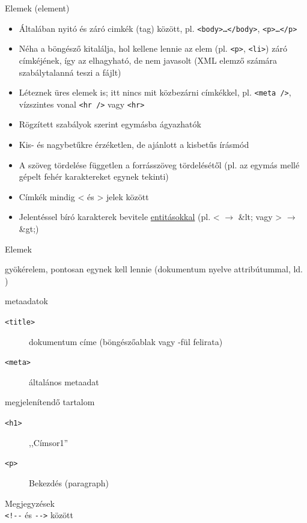 \documentclass[usenames,dvipsnames,aspectratio=169]{beamer}
\newcommand{\kiemel}[1]{{\color{kiemelesszin}#1}}
\newcommand{\hiv}[1]{{\color{hivatkozasszin}#1}}
\begin{document}
\begin{frame}
  Elemek (element)
  \begin{itemize}
    \item Általában nyitó és záró cimkék (tag) között, pl. \texttt{<body>\dots</body>}, \texttt{<p>\dots</p>}
    \item Néha a böngésző kitalálja, hol kellene lennie az elem (pl. \texttt{<p>}, \texttt{<li>}) záró címkéjének, így az elhagyható, de \kiemel{nem javasolt} (XML elemző számára szabálytalanná teszi a fájlt)
    \item Léteznek üres elemek is; itt nincs mit közbezárni címkékkel, pl. \texttt{<meta />}, vízszintes vonal \texttt{<hr~/>} vagy \texttt{<hr>}
    \item Rögzített szabályok szerint egymásba ágyazhatók
    \item Kis- és nagybetűkre érzéketlen, de \kiemel{ajánlott} a kisbetűs írásmód
    \item A szöveg tördelése független a forrásszöveg tördelésétől (pl. az egymás mellé gépelt fehér karaktereket egynek tekinti)
    \item Címkék mindig \kiemel{<} és \kiemel{>} jelek között
    \item Jelentéssel bíró karakterek bevitele \hiv{\href{https://en.wikipedia.org/wiki/List_of_XML_and_HTML_character_entity_references\#Character_entity_references_in_HTML}{entitásokkal}} (pl. \kiemel{<} $\to$ \kiemel{\&lt;} vagy \kiemel{>} $\to$ \kiemel{\&gt;})
  \end{itemize}
\end{frame}

\begin{frame}
  Elemek
  \begin{description}[m]
    \item[\texttt{<html>}] gyökérelem, pontosan egynek kell lennie (dokumentum nyelve attribútummal, ld. )
    \item[\texttt{<head>}] metaadatok
    \begin{description}
      \item[\texttt{<title>}] dokumentum címe (böngészőablak vagy -fül felirata)
      \item[\texttt{<meta>}] általános metaadat
    \end{description}
    \item[\texttt{<body>}] megjelenítendő tartalom
    \begin{description}
      \item[\texttt{<h1>}] ,,Címsor1''
      \item[\texttt{<p>}] Bekezdés (paragraph)
    \end{description}
  \end{description}
  \vfill
  Megjegyzések\\
  \kiemel{\texttt{<!{-}-}} és \kiemel{\texttt{{-}->}} között 
\end{frame}
\end{document}
